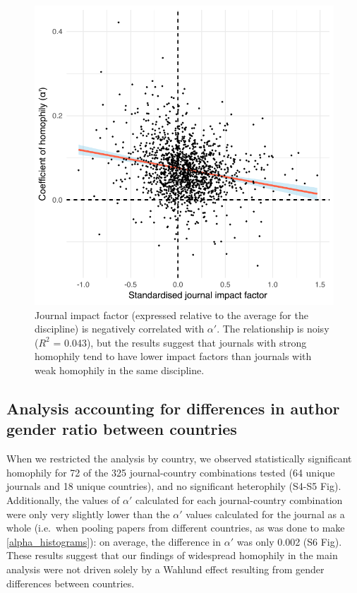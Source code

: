 \documentclass[12pt,]{article}
\begin{document}
\begin{figure}[htbp]
\centering
\includegraphics{../figures/Fig5.pdf}
\caption{Journal impact factor (expressed relative to the average for
the discipline) is negatively correlated with \(\alpha'\). The
relationship is noisy (\(R^2\) = 0.043), but the results suggest that
journals with strong homophily tend to have lower impact factors than
journals with weak homophily in the same discipline.
\label{impact_factor}}
\end{figure}

\subsection{Analysis accounting for differences in author gender ratio
between
countries}\label{analysis-accounting-for-differences-in-author-gender-ratio-between-countries}

When we restricted the analysis by country, we observed statistically
significant homophily for 72 of the 325 journal-country combinations
tested (64 unique journals and 18 unique countries), and no significant
heterophily (S4-S5 Fig). Additionally, the values of \(\alpha'\)
calculated for each journal-country combination were only very slightly
lower than the \(\alpha'\) values calculated for the journal as a whole
(i.e.~when pooling papers from different countries, as was done to make
\autoref{alpha_histograms}): on average, the difference in \(\alpha'\)
was only 0.002 (S6 Fig). These results suggest that our findings of
widespread homophily in the main analysis were not driven solely by a
Wahlund effect resulting from gender differences between countries.
\end{document}
